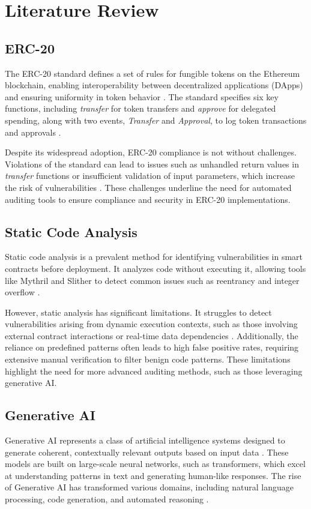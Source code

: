 \section{Literature Review}
\subsection{ERC-20}
The ERC-20 standard defines a set of rules for fungible tokens on the Ethereum blockchain, enabling interoperability between decentralized applications (DApps) and ensuring uniformity in token behavior \cite{ansari2020erc20}. The standard specifies six key functions, including \textit{transfer} for token transfers and \textit{approve} for delegated spending, along with two events, \textit{Transfer} and \textit{Approval}, to log token transactions and approvals \cite{durieux2020icse}.

Despite its widespread adoption, ERC-20 compliance is not without challenges. Violations of the standard can lead to issues such as unhandled return values in \textit{transfer} functions or insufficient validation of input parameters, which increase the risk of vulnerabilities \cite{ansari2020erc20}. These challenges underline the need for automated auditing tools to ensure compliance and security in ERC-20 implementations.

\subsection{Static Code Analysis}
Static code analysis is a prevalent method for identifying vulnerabilities in smart contracts before deployment. It analyzes code without executing it, allowing tools like Mythril and Slither to detect common issues such as reentrancy and integer overflow \cite{durieux2020icse, feist2019slither}.

However, static analysis has significant limitations. It struggles to detect vulnerabilities arising from dynamic execution contexts, such as those involving external contract interactions or real-time data dependencies \cite{durieux2020icse}. Additionally, the reliance on predefined patterns often leads to high false positive rates, requiring extensive manual verification to filter benign code patterns. These limitations highlight the need for more advanced auditing methods, such as those leveraging generative AI.

\subsection{Generative AI}
Generative AI represents a class of artificial intelligence systems designed to generate coherent, contextually relevant outputs based on input data \cite{feuerriegel2024generative}. These models are built on large-scale neural networks, such as transformers, which excel at understanding patterns in text and generating human-like responses. The rise of Generative AI has transformed various domains, including natural language processing, code generation, and automated reasoning \cite{brynjolfsson2023generative}.

